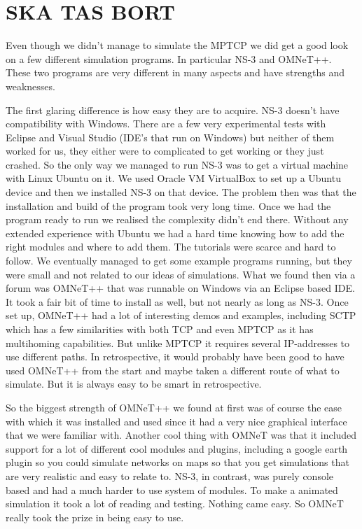 \documentclass[11pt,twocolumn]{article}
\begin{document}
\section{SKA TAS BORT}

Even though we didn't manage to simulate the MPTCP we did get a good look on a few different simulation programs. In particular NS-3 and OMNeT++. These two programs are very different in many aspects and have strengths and weaknesses.

The first glaring difference is how easy they are to acquire. NS-3 doesn't have compatibility with Windows. There are a few very experimental tests with Eclipse and Visual Studio (IDE's that run on Windows) but neither of them worked for us, they either were to complicated to get working or they just crashed. So the only way we managed to run NS-3 was to get a virtual machine with Linux Ubuntu on it. We used Oracle VM VirtualBox to set up a Ubuntu device and then we installed NS-3 on that device. The problem then was that the installation and build of the program took very long time. Once we had the program ready to run we realised the complexity didn't end there. Without any extended experience with Ubuntu we had a hard time knowing how to add the right modules and where to add them. The tutorials were scarce and hard to follow. We eventually managed to get some example programs running, but they were small and not related to our ideas of simulations. What we found then via a forum was OMNeT++ that was runnable on Windows via an Eclipse based IDE. It took a fair bit of time to install as well, but not nearly as long as NS-3. Once set up, OMNeT++ had a lot of interesting demos and examples, including SCTP which has a few similarities with both TCP and even MPTCP as it has multihoming capabilities. But unlike MPTCP it requires several IP-addresses to use different paths. In retrospective, it would probably have been good to have used OMNeT++ from the start and maybe taken a different route of what to simulate. But it is always easy to be smart in retrospective.

So the biggest strength of OMNeT++ we found at first was of course the ease with which it was installed and used since it had a very nice graphical interface that we were familiar with. Another cool thing with OMNeT was that it included support for a lot of different cool modules and plugins, including a google earth plugin so you could simulate networks on maps so that you get simulations that are very realistic and easy to relate to. NS-3, in contrast, was purely console based and had a much harder to use system of modules. To make a animated simulation it took a lot of reading and testing. Nothing came easy. So OMNeT really took the prize in being easy to use.
\end{document}
